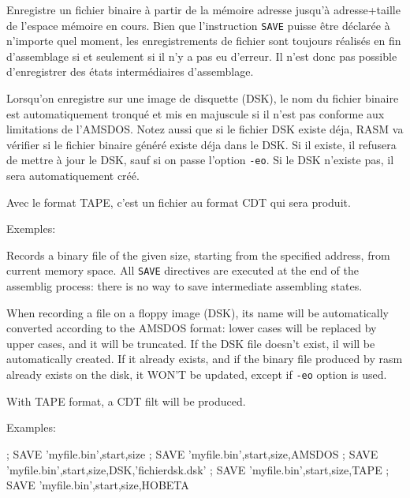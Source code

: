 \begin{xfr}
Enregistre un fichier binaire à partir de la mémoire adresse jusqu'à adresse+taille de l'espace mémoire en cours. Bien que l'instruction \texttt{SAVE} puisse être déclarée à n'importe quel moment, les enregistrements de fichier sont toujours réalisés en fin d'assemblage si et seulement si il n'y a pas eu d'erreur. Il n'est donc pas possible d'enregistrer des états intermédiaires d'assemblage.

Lorsqu'on enregistre sur une image de disquette (DSK), le nom du fichier binaire est automatiquement tronqué et mis en majuscule si il n'est pas conforme aux limitations de l'AMSDOS.
Notez aussi que si le fichier DSK existe déja, RASM va vérifier si le fichier binaire généré existe déja dans le DSK. Si il existe, il refusera de mettre à jour le DSK, sauf si on passe l'option \texttt{-eo}. Si le DSK n'existe pas, il sera automatiquement créé.

Avec le format TAPE, c'est un fichier au format CDT qui sera produit.

Exemples:
\end{xfr}

\begin{xen}
Records a binary file of the given size, starting from the specified address, from current memory space. All \texttt{SAVE} directives are executed at the end of the assemblig process: there is no way to save intermediate assembling states.

When recording a file on a floppy image (DSK), its name will be automatically converted according to the AMSDOS format: lower cases will be replaced by upper cases, and it will be truncated.
If the DSK file doesn't exist, il will be automatically created. If it already exists, and if the binary file produced by rasm already exists on the disk, it WON'T be updated, except if \texttt{-eo} option is used.

With TAPE format, a CDT filt will be produced.

Examples:
\end{xen}

\begin{code}
;
SAVE 'myfile.bin',start,size
\medskip
;
SAVE 'myfile.bin',start,size,AMSDOS
\medskip
;
SAVE 'myfile.bin',start,size,DSK,'fichierdsk.dsk'
\medskip
;
SAVE 'myfile.bin',start,size,TAPE
\medskip
;
SAVE 'myfile.bin',start,size,HOBETA
\end{code}

